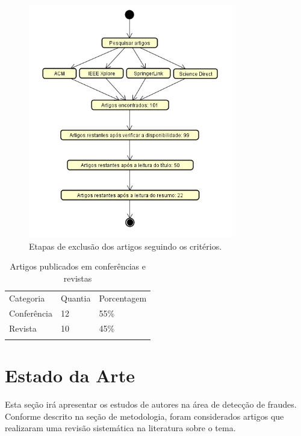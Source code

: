 \documentclass[smallextended]{svjour3}
\begin{document}
\begin{figure}[!ht]
	\centering
	\includegraphics[width=0.8\textwidth]{imagens/diagramaexclusaoartigos.jpg}
	\caption{Etapas de exclusão dos artigos seguindo os critérios.}
	\label{fig:diagramaexlusaoartigos}
\end{figure}

\begin{table}
	\caption{Artigos publicados em conferências e revistas}
	\label{tab:conferenciasrevistas}       %
	\begin{tabular}[!Ht]{lll}
		\hline\noalign{\smallskip}
		Categoria & Quantia & Porcentagem  \\
		\noalign{\smallskip}\hline\noalign{\smallskip}
		Conferência & 12 & 55\% \\
		Revista & 10 & 45\% \\
		\noalign{\smallskip}\hline
	\end{tabular}
\end{table}

\section{Estado da Arte}
\label{sec:4}

Esta seção irá apresentar os estudos de autores na área de detecção de fraudes. Conforme descrito na seção de metodologia, foram considerados artigos que realizaram uma revisão sistemática na literatura sobre o tema.
\end{document}
